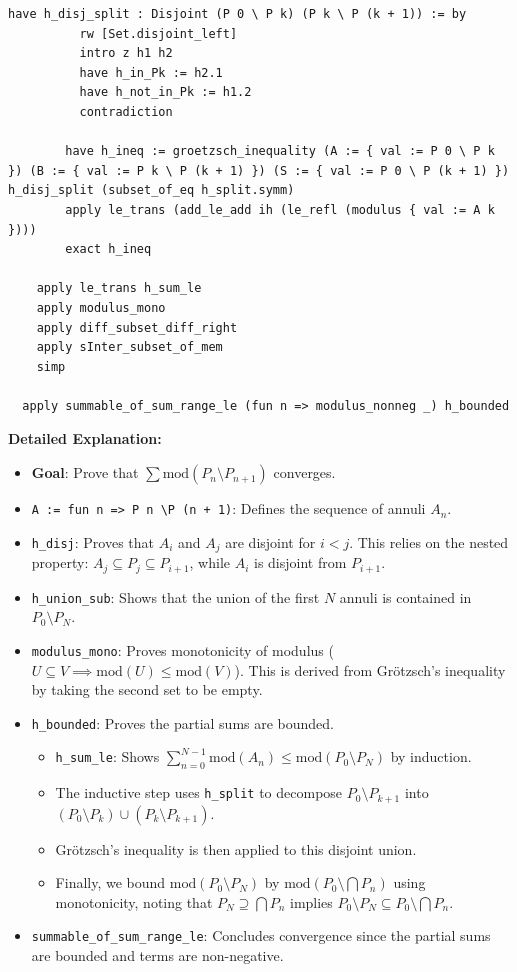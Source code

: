 \begin{lstlisting}[language=Lean]
        have h_disj_split : Disjoint (P 0 \ P k) (P k \ P (k + 1)) := by
          rw [Set.disjoint_left]
          intro z h1 h2
          have h_in_Pk := h2.1
          have h_not_in_Pk := h1.2
          contradiction

        have h_ineq := groetzsch_inequality (A := { val := P 0 \ P k }) (B := { val := P k \ P (k + 1) }) (S := { val := P 0 \ P (k + 1) }) h_disj_split (subset_of_eq h_split.symm)
        apply le_trans (add_le_add ih (le_refl (modulus { val := A k })))
        exact h_ineq

    apply le_trans h_sum_le
    apply modulus_mono
    apply diff_subset_diff_right
    apply sInter_subset_of_mem
    simp

  apply summable_of_sum_range_le (fun n => modulus_nonneg _) h_bounded
\end{lstlisting}

\noindent
\textbf{Detailed Explanation:}
\begin{itemize}
    \item \textbf{Goal}: Prove that $\sum \text{mod}(P_n \setminus P_{n+1})$ converges.
    \item \texttt{A := fun n => P n \textbackslash P (n + 1)}: Defines the sequence of annuli $A_n$.
    \item \texttt{h\_disj}: Proves that $A_i$ and $A_j$ are disjoint for $i < j$. This relies on the nested property: $A_j \subseteq P_j \subseteq P_{i+1}$, while $A_i$ is disjoint from $P_{i+1}$.
    \item \texttt{h\_union\_sub}: Shows that the union of the first $N$ annuli is contained in $P_0 \setminus P_N$.
    \item \texttt{modulus\_mono}: Proves monotonicity of modulus ($U \subseteq V \implies \text{mod}(U) \le \text{mod}(V)$). This is derived from Grötzsch's inequality by taking the second set to be empty.
    \item \texttt{h\_bounded}: Proves the partial sums are bounded.
        \begin{itemize}
            \item \texttt{h\_sum\_le}: Shows $\sum_{n=0}^{N-1} \text{mod}(A_n) \le \text{mod}(P_0 \setminus P_N)$ by induction.
            \item The inductive step uses \texttt{h\_split} to decompose $P_0 \setminus P_{k+1}$ into $(P_0 \setminus P_k) \cup (P_k \setminus P_{k+1})$.
            \item Grötzsch's inequality is then applied to this disjoint union.
            \item Finally, we bound $\text{mod}(P_0 \setminus P_N)$ by $\text{mod}(P_0 \setminus \bigcap P_n)$ using monotonicity, noting that $P_N \supseteq \bigcap P_n$ implies $P_0 \setminus P_N \subseteq P_0 \setminus \bigcap P_n$.
        \end{itemize}
    \item \texttt{summable\_of\_sum\_range\_le}: Concludes convergence since the partial sums are bounded and terms are non-negative.
\end{itemize}

